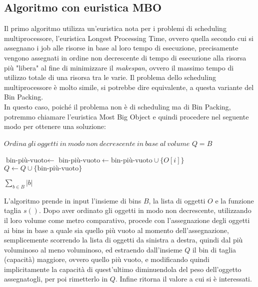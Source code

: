 \subsection{Algoritmo con euristica MBO}
Il primo algoritmo utilizza un'euristica nota per i problemi di scheduling multiprocessore, l'euristica Longest Processing Time, ovvero
quella secondo cui si assegnano i job alle risorse in base al loro tempo di esecuzione, precisamente vengono assegnati in ordine non decrescente di 
tempo di esecuzione alla risorsa più "libera" al fine di minimizzare il \textit{makespan}, ovvero il massimo tempo di utilizzo totale di una risorsa tra le varie.
Il problema dello scheduling multiprocessore è molto simile, si potrebbe dire equivalente, a questa variante del Bin Packing. \\
In questo caso, poiché il problema non è di scheduling ma di Bin Packing, potremmo chiamare l'euristica Most Big Object e quindi procedere nel
seguente modo per ottenere una soluzione:
\begin{algorithm}[H]
\begin{algorithmic}[1]

    \State $ Ordina \: gli \: oggetti \: in \: modo \: non \: decrescente \: in \: base \: al \: volume $
    \State $ Q = B $

        \State $ \text{bin-più-vuoto} \leftarrow $ 
        \State $ \text{bin-più-vuoto} \leftarrow \text{bin-più-vuoto} \cup \{O[i]\} $
        \State $ Q \leftarrow Q \cup \{\text{bin-più-vuoto}\} $
    \EndFor
    
    \State \Return $ \displaystyle\sum\limits_{b \in B} |b| $
\EndFunction

\end{algorithmic}
\end{algorithm}

\noindent
L'algoritmo prende in input l'insieme di bins $ B $, la lista di oggetti $ O $ e la funzione taglia $ s() $. Dopo aver ordinato gli oggetti in modo
non decrescente, utilizzando il loro volume come metro comparativo, procede con l'assegnazione degli oggetti ai bins in base a quale sia quello più
vuoto al momento dell'assegnazione, semplicemente scorrendo la lista di oggetti da sinistra a destra, quindi dal più voluminoso al meno voluminoso, ed estraendo
dall'insieme $ Q $ il bin di taglia (capacità) maggiore, ovvero quello più vuoto, e modificando quindi implicitamente la capacità di quest'ultimo diminuendola
del peso dell'oggetto assegnatogli, per poi rimetterlo in $ Q $. Infine ritorna il valore a cui si è interessati. 

